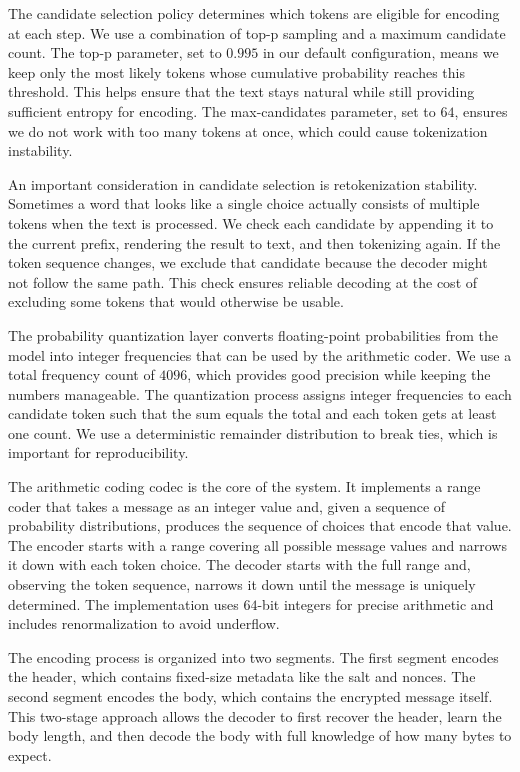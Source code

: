 \documentclass[sigconf,review,anonymous]{acmart}
\begin{document}
The candidate selection policy determines which tokens are eligible for encoding at each step. We use a combination of top-p sampling and a maximum candidate count. The top-p parameter, set to $0.995$ in our default configuration, means we keep only the most likely tokens whose cumulative probability reaches this threshold. This helps ensure that the text stays natural while still providing sufficient entropy for encoding. The max-candidates parameter, set to $64$, ensures we do not work with too many tokens at once, which could cause tokenization instability.

An important consideration in candidate selection is retokenization stability. Sometimes a word that looks like a single choice actually consists of multiple tokens when the text is processed. We check each candidate by appending it to the current prefix, rendering the result to text, and then tokenizing again. If the token sequence changes, we exclude that candidate because the decoder might not follow the same path. This check ensures reliable decoding at the cost of excluding some tokens that would otherwise be usable.

The probability quantization layer converts floating-point probabilities from the model into integer frequencies that can be used by the arithmetic coder. We use a total frequency count of $4096$, which provides good precision while keeping the numbers manageable. The quantization process assigns integer frequencies to each candidate token such that the sum equals the total and each token gets at least one count. We use a deterministic remainder distribution to break ties, which is important for reproducibility.

The arithmetic coding codec is the core of the system. It implements a range coder that takes a message as an integer value and, given a sequence of probability distributions, produces the sequence of choices that encode that value. The encoder starts with a range covering all possible message values and narrows it down with each token choice. The decoder starts with the full range and, observing the token sequence, narrows it down until the message is uniquely determined. The implementation uses $64$-bit integers for precise arithmetic and includes renormalization to avoid underflow.

The encoding process is organized into two segments. The first segment encodes the header, which contains fixed-size metadata like the salt and nonces. The second segment encodes the body, which contains the encrypted message itself. This two-stage approach allows the decoder to first recover the header, learn the body length, and then decode the body with full knowledge of how many bytes to expect.
\end{document}
